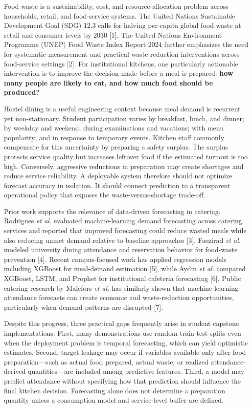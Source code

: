 \documentclass[conference]{IEEEtran}
\begin{document}
Food waste is a sustainability, cost, and resource-allocation problem
across households, retail, and food-service systems. The United Nations
Sustainable Development Goal (SDG) 12.3 calls for halving per-capita
global food waste at retail and consumer levels by 2030 {[}1{]}. The
United Nations Environment Programme (UNEP) Food Waste Index Report 2024
further emphasizes the need for systematic measurement and practical
waste-reduction interventions across food-service settings {[}2{]}. For
institutional kitchens, one particularly actionable intervention is to
improve the decision made before a meal is prepared: \textbf{how many
people are likely to eat, and how much food should be produced?}

Hostel dining is a useful engineering context because meal demand is
recurrent yet non-stationary. Student participation varies by breakfast,
lunch, and dinner; by weekday and weekend; during examinations and
vacations; with menu popularity; and in response to temporary events.
Kitchen staff commonly compensate for this uncertainty by preparing a
safety surplus. The surplus protects service quality but increases
leftover food if the estimated turnout is too high. Conversely,
aggressive reductions in preparation may create shortages and reduce
service reliability. A deployable system therefore should not optimize
forecast accuracy in isolation. It should connect prediction to a
transparent operational policy that exposes the waste-versus-shortage
trade-off.

Prior work supports the relevance of data-driven forecasting in
catering. Rodrigues \emph{et al.} evaluated machine-learning demand
forecasting across catering services and reported that improved
forecasting could reduce wasted meals while also reducing unmet demand
relative to baseline approaches {[}3{]}. Faezirad \emph{et al.} modeled
university dining attendance and reservation behavior for food-waste
prevention {[}4{]}. Recent campus-focused work has applied regression
models including XGBoost for meal-demand estimation {[}5{]}, while Aydın
\emph{et al.} compared XGBoost, LSTM, and Prophet for institutional
cafeteria forecasting {[}6{]}. Public catering research by Malefors
\emph{et al.} has similarly shown that machine-learning attendance
forecasts can create economic and waste-reduction opportunities,
particularly when demand patterns are disrupted {[}7{]}.

Despite this progress, three practical gaps frequently arise in student
capstone implementations. First, many demonstrations use random
train-test splits even when the deployment problem is temporal
forecasting, which can yield optimistic estimates. Second, target
leakage may occur if variables available only after food
preparation---such as actual food prepared, actual waste, or realized
attendance-derived quantities---are included among predictive features.
Third, a model may predict attendance without specifying how that
prediction should influence the final kitchen decision. Forecasting
alone does not determine a preparation quantity unless a consumption
model and service-level buffer are defined.
\end{document}
